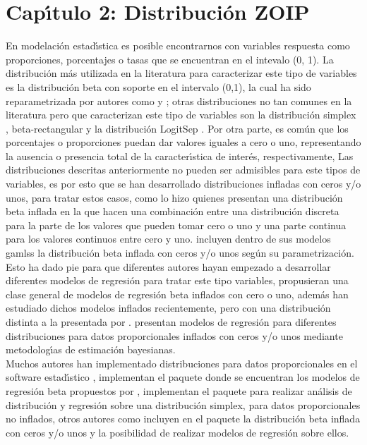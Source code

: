\chapter{Cap\'{\i}tulo 2: Distribuci\'{o}n ZOIP} \label{cap2}

En modelaci\'{o}n estad\'{\i}stica es posible encontrarnos con variables respuesta como proporciones, porcentajes o tasas que se encuentran en el intevalo (0, 1). La distribuci\'{o}n m\'{a}s utilizada en la literatura para caracterizar este tipo de variables es la distribuci\'{o}n beta con soporte en el intervalo (0,1), la cual ha sido reparametrizada por autores como \cite{Ferrari2} y \cite{Stasinopoulos2}; otras distribuciones no tan comunes en la literatura pero que caracterizan este tipo de variables son la distribuci\'{o}n simplex \citep{Jorgensen1}, beta-rectangular \citep{Hahn1} y la distribuci\'{o}n LogitSep \citep{Hossain1}. Por otra parte, es com\'{u}n que los porcentajes o proporciones puedan dar valores iguales a cero o uno, re\-pre\-sen\-tan\-do la ausencia o presencia total de la caracter\'{\i}stica de inter\'{e}s, respectivamente, Las distribuciones descritas anteriormente no pueden ser admisibles para este tipos de variables, es por esto que se han desarrollado distribuciones infladas con ceros y/o unos, para tratar estos casos, como lo hizo \cite{Ospina2} quienes presentan una distribuci\'{o}n beta inflada en la que hacen una combinaci\'{o}n entre una distribuci\'{o}n discreta para la parte de los valores que pueden tomar cero o uno y una parte continua para los valores continuos entre cero y uno. \cite{Stasinopoulos2} incluyen dentro de sus modelos gamlss la distribuci\'{o}n beta inflada con ceros y/o unos seg\'{u}n su parametrizaci\'{o}n.\\

Esto ha dado pie para que diferentes autores hayan empezado a desarrollar diferentes mo\-de\-los de regresi\'{o}n para tratar este tipo variables, \cite{Ospina1} propusieran una clase general de modelos de regresi\'{o}n beta inflados con cero o uno, adem\'{a}s \cite{Kosmidis1} han estudiado dichos modelos inflados recientemente, pero con una distribuci\'{o}n distinta a la presentada por \cite{Ospina1}. \cite{Galvis1} presentan modelos de regresi\'{o}n para diferentes distribuciones para datos proporcionales inflados con ceros y/o unos mediante metodolog\'{\i}as de estimaci\'{o}n bayesianas.\\

Muchos autores han implementado distribuciones para datos proporcionales en el software estad\'{\i}stico , \cite{Zeileis1} implementan el paquete  donde se encuentran los modelos de regresi\'{o}n beta propuestos por \cite{Ferrari2}, \cite{Qiu1} implementan el paquete  para realizar an\'{a}lisis de distribuci\'{o}n y regresi\'{o}n sobre una distribuci\'{o}n simplex, para datos proporcionales no inflados, otros autores como \citep{Stasinopoulos1} incluyen en el paquete  la distribuci\'{o}n beta inflada con ceros y/o unos y la posibilidad de realizar modelos de regresi\'{o}n sobre ellos.\\

